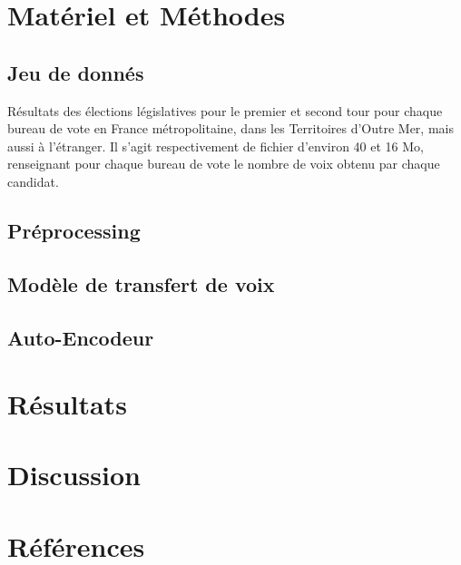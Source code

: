 \documentclass[11pt]{article}
\begin{document}
    \section*{Matériel et Méthodes}
        \subsection*{Jeu de donnés}
            Résultats des élections législatives pour le premier et second tour pour chaque bureau de vote en France métropolitaine, dans les Territoires d'Outre Mer, mais aussi à  l'étranger. Il s'agit respectivement de fichier d'environ 40 et 16 Mo, renseignant pour chaque bureau de vote le nombre de voix obtenu par chaque candidat.
        
        \subsection*{Préprocessing}

        \subsection*{Modèle de transfert de voix}

        \subsection*{Auto-Encodeur}

    \newpage
    \section*{Résultats}

    \newpage
    \section*{Discussion}

    \section*{Références}
\end{document}
